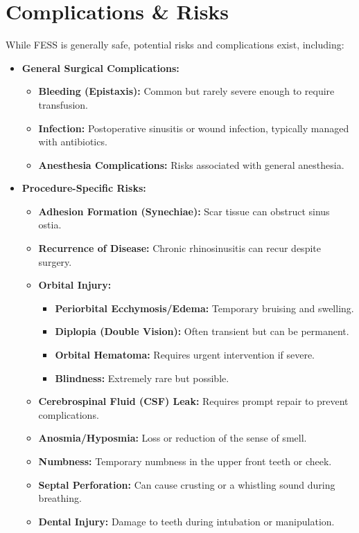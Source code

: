 \section*{Complications \& Risks}
While FESS is generally safe, potential risks and complications exist, including:

\begin{itemize}
  \item \textbf{General Surgical Complications:}
    \begin{itemize}
      \item \textbf{Bleeding (Epistaxis):} Common but rarely severe enough to require transfusion.
      \item \textbf{Infection:} Postoperative sinusitis or wound infection, typically managed with antibiotics.
      \item \textbf{Anesthesia Complications:} Risks associated with general anesthesia.
    \end{itemize}
  \item \textbf{Procedure-Specific Risks:}
    \begin{itemize}
      \item \textbf{Adhesion Formation (Synechiae):} Scar tissue can obstruct sinus ostia.
      \item \textbf{Recurrence of Disease:} Chronic rhinosinusitis can recur despite surgery.
      \item \textbf{Orbital Injury:}
        \begin{itemize}
          \item \textbf{Periorbital Ecchymosis/Edema:} Temporary bruising and swelling.
          \item \textbf{Diplopia (Double Vision):} Often transient but can be permanent.
          \item \textbf{Orbital Hematoma:} Requires urgent intervention if severe.
          \item \textbf{Blindness:} Extremely rare but possible.
        \end{itemize}
      \item \textbf{Cerebrospinal Fluid (CSF) Leak:} Requires prompt repair to prevent complications.
      \item \textbf{Anosmia/Hyposmia:} Loss or reduction of the sense of smell.
      \item \textbf{Numbness:} Temporary numbness in the upper front teeth or cheek.
      \item \textbf{Septal Perforation:} Can cause crusting or a whistling sound during breathing.
      \item \textbf{Dental Injury:} Damage to teeth during intubation or manipulation.
    \end{itemize}
\end{itemize}

